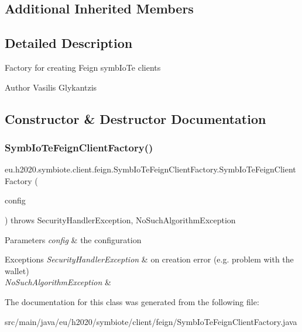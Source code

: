 \subsection*{Additional Inherited Members}


\subsection{Detailed Description}
Factory for creating Feign symb\+Io\+Te clients

\begin{DoxyAuthor}{Author}
Vasilis Glykantzis 
\end{DoxyAuthor}


\subsection{Constructor \& Destructor Documentation}
\mbox{\label{classeu_1_1h2020_1_1symbiote_1_1client_1_1feign_1_1SymbIoTeFeignClientFactory_a1cbed1295ef0cee5ad7ffda4d4cc7bb4}} 
\subsubsection{\texorpdfstring{Symb\+Io\+Te\+Feign\+Client\+Factory()}{SymbIoTeFeignClientFactory()}}
{\footnotesize\ttfamily eu.\+h2020.\+symbiote.\+client.\+feign.\+Symb\+Io\+Te\+Feign\+Client\+Factory.\+Symb\+Io\+Te\+Feign\+Client\+Factory (\begin{DoxyParamCaption}\item[{Config}]{config }\end{DoxyParamCaption}) throws Security\+Handler\+Exception, No\+Such\+Algorithm\+Exception}


\begin{DoxyParams}{Parameters}
{\em config} & the configuration \\
\hline
\end{DoxyParams}

\begin{DoxyExceptions}{Exceptions}
{\em Security\+Handler\+Exception} & on creation error (e.\+g. problem with the wallet) \\
\hline
{\em No\+Such\+Algorithm\+Exception} & \\
\hline
\end{DoxyExceptions}


The documentation for this class was generated from the following file\+:\begin{DoxyCompactItemize}
\item 
src/main/java/eu/h2020/symbiote/client/feign/Symb\+Io\+Te\+Feign\+Client\+Factory.\+java\end{DoxyCompactItemize}

